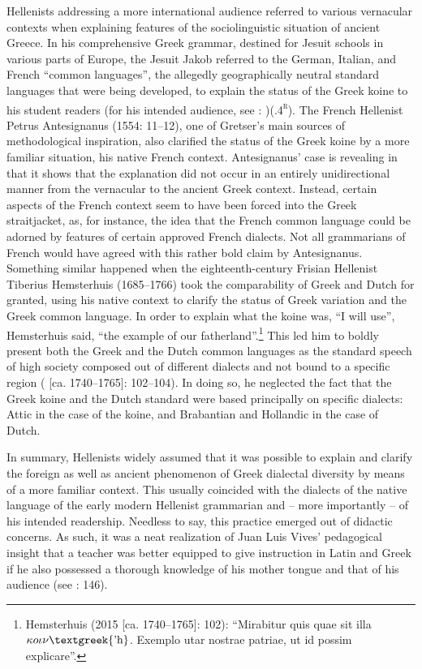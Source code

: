 \documentclass[output=paper]{langsci/langscibook}
\begin{document}
Hellenists addressing a more international audience referred to various vernacular contexts when explaining features of the sociolinguistic situation of ancient Greece. In his comprehensive Greek grammar, destined for Jesuit schools in various parts of Europe, the Jesuit Jakob \citet[20]{Gretser1593} referred to the German, Italian, and French “common languages”, the allegedly geographically neutral standard languages that were being developed, to explain the status of the Greek koine to his student readers (for his intended audience, see \citealt{Gretser1593}: )(.4\textsc{\textsuperscript{r}}). The French Hellenist Petrus Antesignanus (1554: 11–12), one of Gretser’s main sources of methodological inspiration, also clarified the status of the Greek koine by a more familiar situation, his native French context. Antesignanus’ case is revealing in that it shows that the explanation did not occur in an entirely unidirectional manner from the vernacular to the ancient Greek context. Instead, certain aspects of the French context seem to have been forced into the Greek straitjacket, as, for instance, the idea that the French common language could be adorned by features of certain approved French dialects. Not all grammarians of French would have agreed with this rather bold claim by Antesignanus. Something similar happened when the eighteenth-century Frisian Hellenist Tiberius Hemsterhuis (1685–1766) took the comparability of Greek and Dutch for granted, using his native context to clarify the status of Greek variation and the Greek common language. In order to explain what the koine was, “I will use”, Hemsterhuis said, “the example of our fatherland”.\footnote{Hemsterhuis (2015 [ca. 1740–1765]: 102): “Mirabitur quis quae sit illa $\kappa o\iota \nu \text{\textgreek{'h}}$. Exemplo utar nostrae patriae, ut id possim explicare”.} This led him to boldly present both the Greek and the Dutch common languages as the standard speech of high society composed out of different dialects and not bound to a specific region (\citealt{Hemsterhuis2015} [ca. 1740–1765]: 102–104). In doing so, he neglected the fact that the Greek koine and the Dutch standard were based principally on specific dialects: Attic in the case of the koine, and Brabantian and Hollandic in the case of Dutch.

In summary, Hellenists widely assumed that it was possible to explain and clarify the foreign as well as ancient phenomenon of Greek dialectal diversity by means of a more familiar context. This usually coincided with the dialects of the native language of the early modern Hellenist grammarian and – more importantly – of his intended readership. Needless to say, this practice emerged out of didactic concerns. As such, it was a neat realization of Juan Luis Vives’ pedagogical insight that a teacher was better equipped to give instruction in Latin and Greek if he also possessed a thorough knowledge of his mother tongue and that of his audience (see \citealt{Padley1985}: 146).
\end{document}
